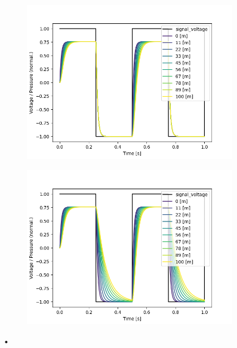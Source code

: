 \documentclass[fontsize=12pt, a4paper]{scrartcl}
\begin{document}
\begin{figure}[H]
	\centering
	\begin{subfigure}[H]{0.48\textwidth}
		\includegraphics[width=\textwidth, valign=t]{bilder/tubelength/tl_out_branch_multisweep.png}
	\end{subfigure}
	\begin{subfigure}[H]{0.48\textwidth}
		\includegraphics[width=\textwidth, valign=t]{bilder/tubelength/tl_both_branch_multisweep.png}
	\end{subfigure}
	\caption{•}
\end{figure}
\end{document}
